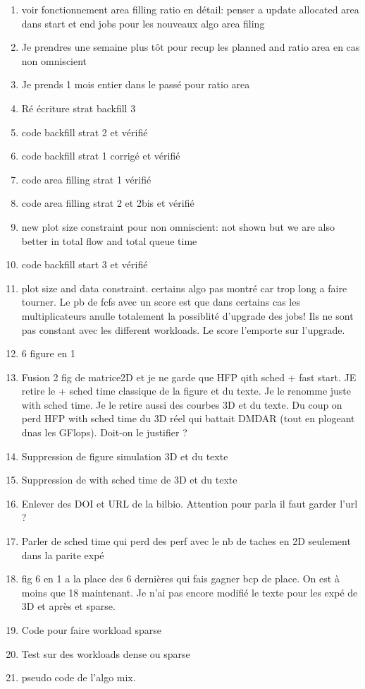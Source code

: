 \documentclass[a4paper]{article}
\begin{document}
\begin{enumerate}
		\item voir fonctionnement area filling ratio en détail: penser a update allocated area dans start et end jobs pour les nouveaux algo area filing
		\item Je prendres une semaine plus tôt pour recup les planned and ratio area en cas non omniscient
		\item Je prends 1 mois entier dans le passé pour ratio area
		\item Ré écriture strat backfill 3
		\item code backfill strat 2 et vérifié
		\item code backfill strat 1 corrigé et vérifié
		\item code area filling strat 1 vérifié
		\item code area filling strat 2 et 2bis et vérifié
		\item new plot size constraint pour non omniscient: not shown but we are also better in total flow and total queue time
		\item code backfill start 3 et vérifié
		\item plot size and data constraint. certains algo pas montré car trop long a faire tourner. Le pb de fcfs avec un score est que dans certains cas les multiplicateurs anulle totalement la possiblité d'upgrade des jobs! Ils ne sont pas constant avec les different workloads. Le score l'emporte sur l'upgrade.
		
		\item 6 figure en 1
		\item Fusion 2 fig de matrice2D et je ne garde que HFP qith sched + fast start. JE retire le + sched time classique de la figure et du texte. Je le renomme juste with sched time. Je le retire aussi des courbes 3D et du texte. Du coup on perd HFP with sched time du 3D réel qui battait DMDAR (tout en plogeant dnas les GFlops). Doit-on le justifier ?
		\item Suppression de figure simulation 3D et du texte
		\item Suppression de with sched time de 3D et du texte
		\item Enlever des DOI et URL de la bilbio. Attention pour parla il faut garder l'url ?
		\item Parler de sched time qui perd des perf avec le nb de taches en 2D seulement dans la parite expé
		\item fig 6 en 1 a la place des 6 dernières qui fais gagner bcp de place. On est à moins que 18 maintenant. Je n'ai pas encore modifié le texte pour les expé de 3D et après et sparse.
		
		\item Code pour faire workload sparse
		\item Test sur des workloads dense ou sparse
		\item pseudo code de l'algo mix.
	\end{enumerate}
	
\end{document}
